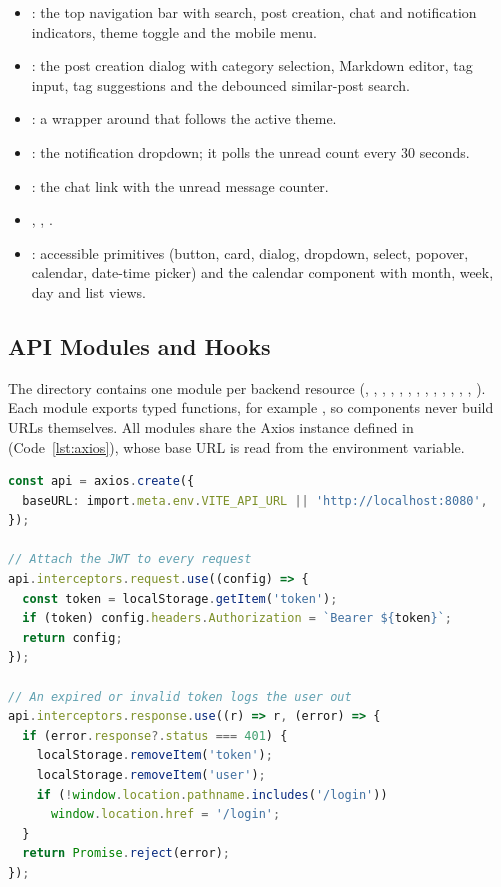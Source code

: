 \begin{itemize}
  \item {}: the top navigation bar with search, post creation, chat and
    notification indicators, theme toggle and the mobile menu.
  \item {}: the post creation dialog with category selection,
    Markdown editor, tag input, tag suggestions and the debounced similar-post search.
  \item {}: a wrapper around  that follows
    the active theme.
  \item {}: the notification dropdown; it polls the unread count
    every 30 seconds.
  \item {}: the chat link with the unread message counter.
  \item {}, , .
  \item {}: accessible primitives (button, card, dialog, dropdown,
    select, popover, calendar, date-time picker) and the  calendar
    component with month, week, day and list views.
\end{itemize}

\subsection{API Modules and Hooks}

The  directory contains one module per backend resource (,
, , , , ,
, , , , ,
, , ). Each module exports typed functions,
for example , so components never build
URLs themselves. All modules share the Axios instance defined in 
(Code~\ref{lst:axios}), whose base URL is read from the 
environment variable.

\begin{lstlisting}[language=TypeScript,caption={Shared Axios instance with authentication interceptors (\texttt{api.ts}, abridged)},label={lst:axios}]
const api = axios.create({
  baseURL: import.meta.env.VITE_API_URL || 'http://localhost:8080',
});

// Attach the JWT to every request
api.interceptors.request.use((config) => {
  const token = localStorage.getItem('token');
  if (token) config.headers.Authorization = `Bearer ${token}`;
  return config;
});

// An expired or invalid token logs the user out
api.interceptors.response.use((r) => r, (error) => {
  if (error.response?.status === 401) {
    localStorage.removeItem('token');
    localStorage.removeItem('user');
    if (!window.location.pathname.includes('/login'))
      window.location.href = '/login';
  }
  return Promise.reject(error);
});
\end{lstlisting}

